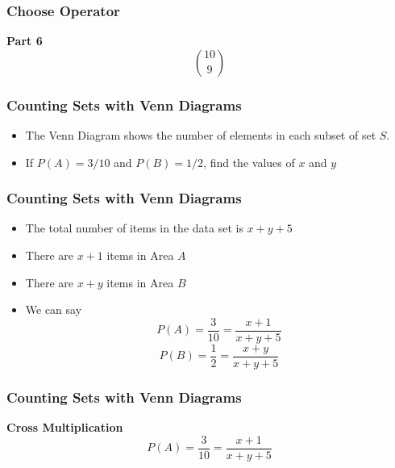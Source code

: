 \documentclass[IntroMain.tex]{subfiles}
\begin{document}
	\begin{frame}
		\frametitle{Choose Operator}
		\large
		\vspace{-3cm}
		\textbf{Part 6}
		\huge
		\[{10 \choose 9}\]
		
	\end{frame}
	\begin{frame}
		
	\end{frame}
	\begin{frame}
		\frametitle{Counting Sets with Venn Diagrams}
		\Large
		\vspace{-2cm}
		\begin{itemize}
			\item The Venn Diagram shows the number of elements in each subset of set $S$.
			\item If $P(A) = 3/10$ and $P(B) = 1/2$, find the values of $x$ and $y$
		\end{itemize}
	\end{frame}
	
	
	
	\begin{frame}
		\frametitle{Counting Sets with Venn Diagrams}
		\Large
		\vspace{-1cm}
		\begin{itemize}
			\item The total number of items in the data set is $x+y+5$
			\item There are $x+1$ items in Area $A$
			\item There are $x+y$ items in Area $B$
			\item We can say
			\[ P(A) = \frac{3}{10} = \frac{x+1}{x+y+5}\]
			\[ P(B) = \frac{1}{2} = \frac{x+y}{x+y+5} \]
		\end{itemize}
	\end{frame}
	
	
	
	\begin{frame}
		\frametitle{Counting Sets with Venn Diagrams}
		\Large
		\vspace{-2.5cm}
		\textbf{Cross Multiplication}
		\[ P(A) = \frac{3}{10} = \frac{x+1}{x+y+5}\]
		
	\end{frame}
	
\end{document}

